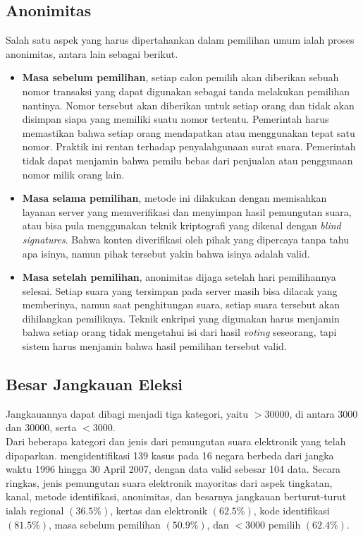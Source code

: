 \subsection{Anonimitas}

Salah satu aspek yang harus dipertahankan dalam pemilihan umum ialah proses anonimitas, antara lain sebagai berikut.

\begin{itemize}
    \setlength\itemsep{-0.5em}
    \item \textbf{Masa sebelum pemilihan}, setiap calon pemilih akan diberikan sebuah nomor transaksi yang dapat digunakan sebagai tanda melakukan pemilihan nantinya. Nomor tersebut akan diberikan untuk setiap orang dan tidak akan disimpan siapa yang memiliki suatu nomor tertentu. Pemerintah harus memastikan bahwa setiap orang mendapatkan atau menggunakan tepat satu nomor. Praktik ini rentan terhadap penyalahgunaan surat suara. Pemerintah tidak dapat menjamin bahwa pemilu bebas dari penjualan atau penggunaan nomor milik orang lain.
    \item \textbf{Masa selama pemilihan}, metode ini dilakukan dengan memisahkan layanan server yang memverifikasi dan menyimpan hasil pemungutan suara, atau bisa pula menggunakan teknik kriptografi yang dikenal dengan \textit{blind signatures}. Bahwa konten diverifikasi oleh pihak yang dipercaya tanpa tahu apa isinya, namun pihak tersebut yakin bahwa isinya adalah valid.
    \item \textbf{Masa setelah pemilihan}, anonimitas dijaga setelah hari pemilihannya selesai. Setiap suara yang tersimpan pada server masih bisa dilacak yang memberinya, namun saat penghitungan suara, setiap suara tersebut akan dihilangkan pemiliknya. Teknik enkripsi yang digunakan harus menjamin bahwa setiap orang tidak mengetahui isi dari hasil \textit{voting} seseorang, tapi sistem harus menjamin bahwa hasil pemilihan tersebut valid.
\end{itemize}

\subsection{Besar Jangkauan Eleksi}

Jangkauannya dapat dibagi menjadi tiga kategori, yaitu $> 30000$, di antara $3000$ dan $30000$, serta $< 3000$.\\

Dari beberapa kategori dan jenis dari pemungutan suara elektronik yang telah dipaparkan. \cite{review1} mengidentifikasi 139 kasus pada 16 negara berbeda dari jangka waktu 1996 hingga 30 April 2007, dengan data valid sebesar 104 data. Secara ringkas, jenis pemungutan suara elektronik mayoritas dari aspek tingkatan, kanal, metode identifikasi, anonimitas, dan besarnya jangkauan berturut-turut ialah regional $(36.5\%)$, kertas dan elektronik $(62.5\%)$, kode identifikasi $(81.5\%)$, masa sebelum pemilihan $(50.9\%)$, dan $< 3000$ pemilih $(62.4\%)$.

